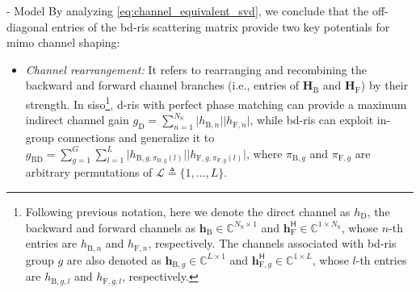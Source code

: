 \documentclass[journal]{IEEEtran}
\newtheorem{remark}{Remark}
\begin{document}
\begin{section}{- Model}
	By analyzing \eqref{eq:channel_equivalent_svd}, we conclude that the off-diagonal entries of the \gls{bd}-\gls{ris} scattering matrix provide two key potentials for \gls{mimo} channel shaping:
	\begin{itemize}
		\item \emph{Channel rearrangement:} It refers to rearranging and recombining the backward and forward channel branches (i.e., entries of $\mathbf{H}_\mathrm{B}$ and $\mathbf{H}_\mathrm{F}$)
		by their strength.
		In \gls{siso}\footnote{Following previous notation, here we denote the direct channel as $h_\mathrm{D}$, the backward and forward channels as $\mathbf{h}_\mathrm{B} \in \mathbb{C}^{N_\mathrm{S} \times 1}$ and $\mathbf{h}_\mathrm{F}^\mathsf{H} \in \mathbb{C}^{1 \times N_\mathrm{S}}$, whose $n$-th entries are $h_{\mathrm{B},n}$ and $h_{\mathrm{F},n}$, respectively.
		The channels associated with \gls{bd}-\gls{ris} group $g$ are also denoted as $\mathbf{h}_{\mathrm{B},g} \in \mathbb{C}^{L \times 1}$ and $\mathbf{h}_{\mathrm{F},g}^\mathsf{H} \in \mathbb{C}^{1 \times L}$, whose $l$-th entries are $h_{\mathrm{B},g,l}$ and $h_{\mathrm{F},g,l}$, respectively.}, \gls{d}-\gls{ris} with perfect phase matching can provide a maximum indirect channel gain $g_\mathrm{D}=\sum_{n=1}^{N_\mathrm{S}} \lvert h_{\mathrm{B},n} \rvert \lvert h_{\mathrm{F},n} \rvert$,
		while \gls{bd}-\gls{ris} can exploit in-group connections and generalize it to
		$g_\mathrm{BD}=\sum_{g=1}^{G} \sum_{l=1}^{L} \lvert h_{\mathrm{B},g,\pi_{\mathrm{B},g}(l)} \rvert \lvert h_{\mathrm{F},g,\pi_{\mathrm{F},g}(l)} \rvert$,
		where $\pi_{\mathrm{B},g}$ and $\pi_{\mathrm{F},g}$ are arbitrary permutations of $\mathcal{L} \triangleq \{1, \ldots, L\}$.

\end{itemize}
\end{section}
\end{document}
